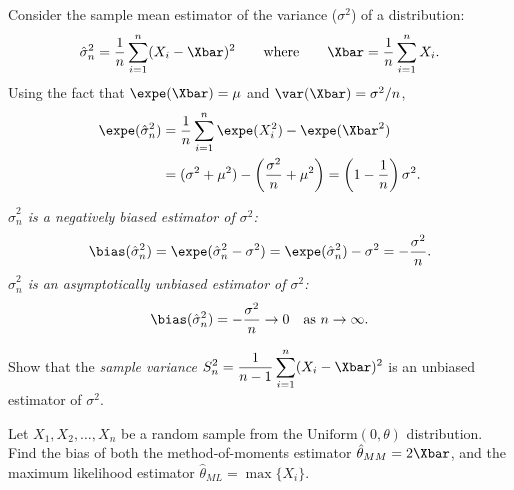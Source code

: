 \begin{example}
Consider the sample mean estimator of the variance ($\sigma^2$) of a distribution:
\[
\hat{\sigma}^2_n = \frac{1}{n}\sum_{i=1}^n (X_i-\Xbar)^2
\qquad\text{where}\qquad
\Xbar = \frac{1}{n}\sum_{i=1}^n X_i.
\]
Using the fact that $\expe(\Xbar) = \mu$ and $\var(\Xbar) = \sigma^2/n$, 
\begin{align*}
\expe(\hat{\sigma}^2_n) 
	& = \frac{1}{n}\sum_{i=1}^n \expe(X_i^2) - \expe(\Xbar^2) \\
	& = (\sigma^2+\mu^2)-\left(\frac{\sigma^2}{n} + \mu^2\right)
	= \left(1-\frac{1}{n}\right)\sigma^2.
\end{align*}

\bit
\it $\hat{\sigma}^2_n$ is a \emph{negatively biased} estimator of $\sigma^2$:
\[
\bias(\hat{\sigma}^2_n) = \expe(\hat{\sigma}^2_n - \sigma^2) = \expe(\hat{\sigma}^2_n) - \sigma^2 = -\frac{\sigma^2}{n}.
\]
\it $\hat{\sigma}^2_n$ is an \emph{asymptotically unbiased} estimator of $\sigma^2$:  \[
\bias(\hat{\sigma}^2_n) = -\frac{\sigma^2}{n} \to 0 \text{\quad as $n\to\infty$.}
\]
\eit
\end{example}

\begin{exercise}
Show that the \emph{sample variance} $\displaystyle S_n^2 = \frac{1}{n-1}\sum_{i=1}^n (X_i-\Xbar)^2$ is an unbiased estimator of $\sigma^2$.
\end{exercise}


\begin{example}
Let $X_1,X_2,\ldots,X_n$ be a random sample from the $\text{Uniform}(0,\theta)$ distribution. Find the bias of both the method-of-moments estimator $\hat{\theta}_{MM} = 2\Xbar$, and the maximum likelihood estimator $\hat{\theta}_{ML}=\max\{X_i\}$.
\end{example}

